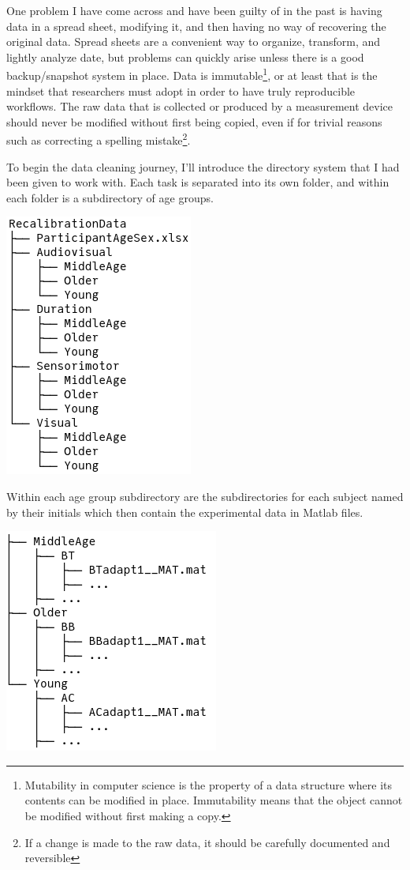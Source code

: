 \documentclass[11pt, oneside, openany]{scrbook}
\begin{document}
One problem I have come across and have been guilty of in the past is having data in a spread sheet, modifying it, and then having no way of recovering the original data. Spread sheets are a convenient way to organize, transform, and lightly analyze date, but problems can quickly arise unless there is a good backup/snapshot system in place. Data is immutable\footnote{Mutability in computer science is the property of a data structure where its contents can be modified in place. Immutability means that the object cannot be modified without first making a copy.}, or at least that is the mindset that researchers must adopt in order to have truly reproducible workflows. The raw data that is collected or produced by a measurement device should never be modified without first being copied, even if for trivial reasons such as correcting a spelling mistake\footnote{If a change is made to the raw data, it should be carefully documented and reversible}.

To begin the data cleaning journey, I'll introduce the directory system that I had been given to work with. Each task is separated into its own folder, and within each folder is a subdirectory of age groups.

\begin{center}\includegraphics[width=0.3\linewidth]{figures/data_dir} \end{center}

Within each age group subdirectory are the subdirectories for each subject named by their initials which then contain the experimental data in Matlab files.

\begin{center}\includegraphics[width=0.35\linewidth]{figures/data_subdir} \end{center}
\end{document}
